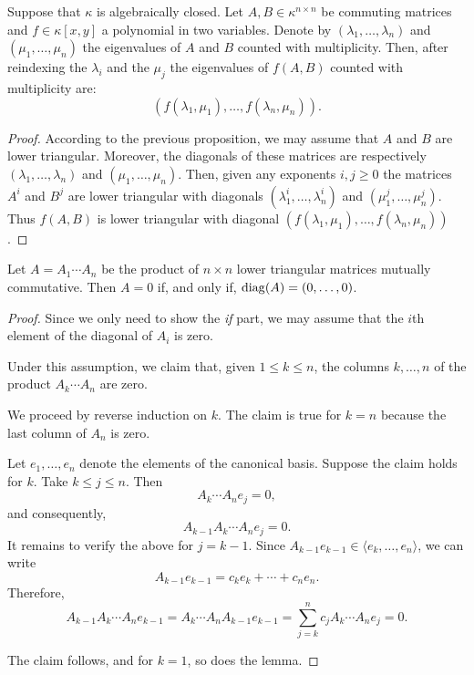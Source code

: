 \begin{thm}\label{thm:eigenvalues-of-f(A,B)}
    Suppose that\/ $\kappa$ is algebraically closed. Let\/ $A, B \in \kappa^{n \times n}$ be commuting matrices and\/ $f \in \kappa[x, y]$ a polynomial in two variables. Denote by\/ $(\lambda_1, \dots, \lambda_n)$ and\/ $(\mu_1, \dots, \mu_n)$ the eigenvalues of\/ $A$ and\/ $B$ counted with multiplicity. Then, after reindexing the\/ $\lambda_i$ and the\/ $\mu_j$ the eigenvalues of\/ $f(A,B)$ counted with multiplicity are:
    $$
        (f(\lambda_1,\mu_1),\dots,f(\lambda_n, \mu_n)).
    $$
\end{thm}

\begin{proof}
    According to the previous proposition, we may assume that $A$ and $B$ are lower triangular. Moreover, the diagonals of these matrices are respectively $(\lambda_1,\dots,\lambda_n)$ and\/ $(\mu_1,\dots,\mu_n)$. Then, given any exponents $i,j\ge0$ the matrices $A^i$ and $B^j$ are lower triangular with diagonals $(\lambda_1^i, \dots,\lambda_n^i)$ and\/ $(\mu_1^j,\dots,\mu_n^j)$. Thus $f(A,B)$ is lower triangular with diagonal $(f(\lambda_1,\mu_1),\dots,f(\lambda_n,\mu_n))$.    
\end{proof}

\begin{lem}\label{lem:null-diagonal-product}
    Let $A=A_1\cdots A_n$ be the product of $n\times n$ lower triangular matrices mutually commutative. Then $A=0$ if, and only if, ${\operatorname{diag}}(A)=(0,\dots,0)$.
\end{lem}

\begin{proof}
    Since we only need to show the \textit{if\/} part, we may assume that the $i$th element of the diagonal of $A_i$ is zero.
    
    Under this assumption, we claim that, given $1 \leq k \leq n$, the columns $k,\dots, n$ of the product $A_k \cdots A_n$ are zero.
    
    We proceed by reverse induction on $k$. The claim is true for $k = n$ because the last column of $A_n$ is zero.
    
    Let $e_1, \dots, e_n$ denote the elements of the canonical basis. Suppose the claim holds for $k$. Take $k \leq j \leq n$. Then
    $$
    A_k \cdots A_n e_j = 0,
    $$
    and consequently,
    $$
    A_{k-1} A_k \cdots A_n e_j = 0.
    $$
    It remains to verify the above for $j = k-1$. Since $A_{k-1} e_{k-1} \in \langle e_k, \dots, e_n \rangle$, we can write
    $$
    A_{k-1} e_{k-1} = c_k e_k + \cdots + c_n e_n.
    $$
    Therefore,
    $$
    A_{k-1} A_k \cdots A_n e_{k-1} =
        A_k \cdots A_n A_{k-1} e_{k-1}
        = \sum_{j=k}^n c_j A_k \cdots A_n e_j
        = 0.
    $$
    
    The claim follows, and for $k = 1$, so does the lemma.
\end{proof}

